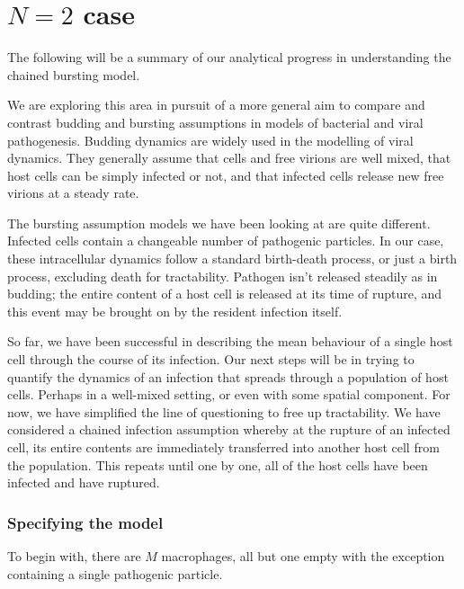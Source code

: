 






\section{$N = 2$ case}

The following will be a summary of our analytical progress in understanding the chained bursting model. 

We are exploring this area in pursuit of a more general aim to compare and contrast budding and bursting assumptions in models of bacterial and viral pathogenesis. Budding dynamics are widely used in the modelling of viral dynamics. They generally assume that cells and free virions are well mixed, that host cells can be simply infected or not, and that infected cells release new free virions at a steady rate.\par
The bursting assumption models we have been looking at are quite different. Infected cells contain a changeable number of pathogenic particles. In our case, these intracellular dynamics follow a standard birth-death process, or just a birth process, excluding death for tractability. Pathogen isn't released steadily as in budding; the entire content of a host cell is released at its time of rupture, and this event may be brought on by the resident infection itself. \par
So far, we have been successful in describing the mean behaviour of a single host cell through the course of its infection. Our next steps will be in trying to quantify the dynamics of an infection that spreads through a population of host cells. Perhaps in a well-mixed setting, or even with some spatial component. For now, we have simplified the line of questioning to free up tractability. We have considered a chained infection assumption whereby at the rupture of an infected cell, its entire contents are immediately transferred into another host cell from the population. This repeats until one by one, all of the host cells have been infected and have ruptured. 



\subsubsection*{Specifying the model}


To begin with, there are $M$ macrophages, all but one empty with the exception containing a single pathogenic particle. 

